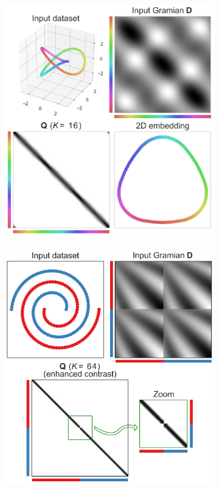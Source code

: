 \documentclass[twoside,11pt]{article}
\begin{document}
\begin{figure}
	\centering
	\begin{subfigure}{.37\columnwidth}
		\centering
		\includegraphics[width=.95\columnwidth]{embedding/trefoil_knot}
		\caption{}
		\label{fig:trefoil}
	\end{subfigure}%
	\begin{subfigure}{.37\columnwidth}
		\centering
		\includegraphics[width=.95\columnwidth]{clustering/double_swiss_roll}
		\caption{}
		\label{fig:double_swiss_roll}
	\end{subfigure}


\end{figure}
\end{document}
